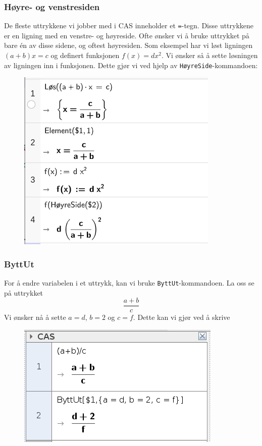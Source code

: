 \subsubsection{Høyre- og venstresiden \label{hogl}}
De fleste uttrykkene vi jobber med i CAS inneholder et \texttt{=}-tegn. Disse uttrykkene er en ligning med en venstre- og høyreside. Ofte ønsker vi å bruke uttrykket på bare én av disse sidene, og oftest høyresiden. Som eksempel har vi løst ligningen $ (a+b)x = c $ og definert funksjonen $ f(x)= d x^2 $. Vi ønsker så å sette løsningen av ligningen inn i funksjonen. Dette gjør vi ved hjelp av \texttt{HøyreSide}-kommandoen:
\begin{figure}
	\centering
	\includegraphics[scale=0.5]{fig/hoyre}
\end{figure}
\newpage
\subsubsection{ByttUt}
For å endre variabelen i et uttrykk, kan vi bruke \texttt{ByttUt}-kommandoen. La oss se på uttrykket
\[ \frac{a+b}{c} \]
Vi ønsker nå å sette $ {a=d }$, $ {b=2} $ og $ {c=f} $. Dette kan vi gjør ved å skrive
\begin{figure}
	\centering
	\includegraphics[scale=0.5]{fig/cas2}
\end{figure}	
\newpage
